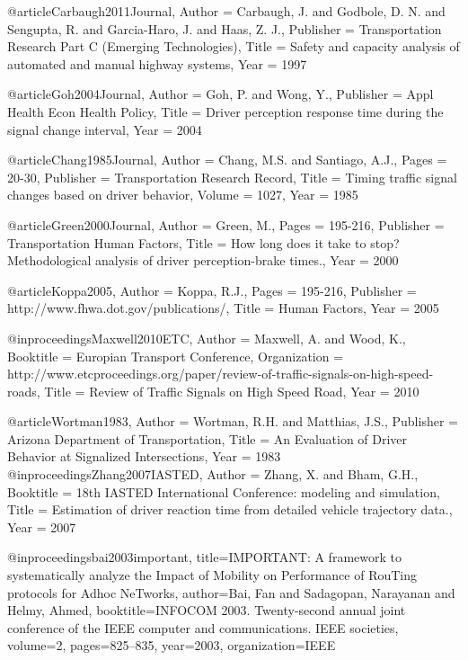 {{{{{{{{@article{Carbaugh2011Journal,
	Author = {Carbaugh, J. and Godbole,  D. N. and Sengupta, R. and Garcia-Haro, J. and Haas, Z. J.},
	Publisher = {Transportation Research Part C (Emerging Technologies)},
	Title = {Safety and capacity analysis of automated and manual highway systems},
	Year = {1997}}

@article{Goh2004Journal,
	Author = {Goh, P. and Wong, Y.},
	Publisher = {Appl Health Econ Health Policy},
	Title = {Driver perception response time during the signal change interval},
	Year = {2004}}

@article{Chang1985Journal,
	Author = {Chang, M.S. and Santiago, A.J.},
	Pages = {20-30},
	Publisher = {Transportation Research Record},
	Title = {Timing traffic signal changes based on driver behavior},
	Volume = {1027},
	Year = {1985}}

@article{Green2000Journal,
	Author = {Green, M.},
	Pages = {195-216},
	Publisher = {Transportation Human Factors},
	Title = {How long does it take to stop? Methodological analysis of driver perception-brake times.},
	Year = {2000}}

@article{Koppa2005,
	Author = {Koppa, R.J.},
	Pages = {195-216},
	Publisher = {http://www.fhwa.dot.gov/publications/},
	Title = {Human Factors},
	Year = {2005}}

@inproceedings{Maxwell2010ETC,
	Author = {Maxwell, A. and Wood, K.},
	Booktitle = {Europian Transport Conference},
	Organization = {http://www.etcproceedings.org/paper/review-of-traffic-signals-on-high-speed-roads},
	Title = {Review of Traffic Signals on High Speed Road},
	Year = {2010}}

@article{Wortman1983,
	Author = {Wortman, R.H. and Matthias, J.S.},
	Publisher = {Arizona Department of Transportation},
	Title = {An Evaluation of Driver Behavior at Signalized Intersections},
	Year = {1983}}
@inproceedings{Zhang2007IASTED,
	Author = {Zhang, X. and Bham, G.H.},
	Booktitle = {18th IASTED International Conference: modeling and simulation},
	Title = {Estimation of driver reaction time from detailed vehicle trajectory data.},
	Year = {2007}}


@inproceedings{bai2003important,
  title={IMPORTANT: A framework to systematically analyze the Impact of Mobility on Performance of RouTing protocols for Adhoc NeTworks},
  author={Bai, Fan and Sadagopan, Narayanan and Helmy, Ahmed},
  booktitle={INFOCOM 2003. Twenty-second annual joint conference of the IEEE computer and communications. IEEE societies},
  volume={2},
  pages={825--835},
  year={2003},
  organization={IEEE}
}


}}}}}}}}

